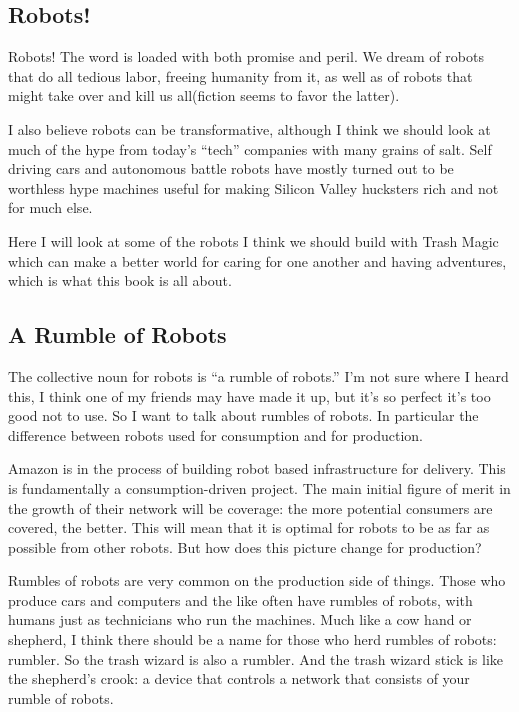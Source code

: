 \subsection{Robots!}\label{robots}

Robots! The word is loaded with both promise and peril. We dream of
robots that do all tedious labor, freeing humanity from it, as well as
of robots that might take over and kill us all(fiction seems to favor
the latter).

I also believe robots can be transformative, although I think we should
look at much of the hype from today's ``tech'' companies with many
grains of salt. Self driving cars and autonomous battle robots have
mostly turned out to be worthless hype machines useful for making
Silicon Valley hucksters rich and not for much else.

Here I will look at some of the robots I think we should build with
Trash Magic which can make a better world for caring for one another and
having adventures, which is what this book is all about.

\subsection{A Rumble of Robots}\label{a-rumble-of-robots}

The collective noun for robots is ``a rumble of robots.'' I'm not sure
where I heard this, I think one of my friends may have made it up, but
it's so perfect it's too good not to use. So I want to talk about
rumbles of robots. In particular the difference between robots used for
consumption and for production.

Amazon is in the process of building robot based infrastructure for
delivery. This is fundamentally a consumption-driven project. The main
initial figure of merit in the growth of their network will be coverage:
the more potential consumers are covered, the better. This will mean
that it is optimal for robots to be as far as possible from other
robots. But how does this picture change for production?

Rumbles of robots are very common on the production side of things.
Those who produce cars and computers and the like often have rumbles of
robots, with humans just as technicians who run the machines. Much like
a cow hand or shepherd, I think there should be a name for those who
herd rumbles of robots: rumbler. So the trash wizard is also a rumbler.
And the trash wizard stick is like the shepherd's crook: a device that
controls a network that consists of your rumble of robots.

